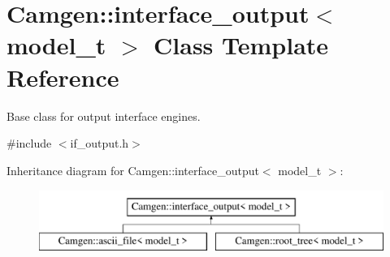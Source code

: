\hypertarget{a00315}{\section{Camgen\-:\-:interface\-\_\-output$<$ model\-\_\-t $>$ Class Template Reference}
\label{a00315}
}


Base class for output interface engines.  




{\ttfamily \#include $<$if\-\_\-output.\-h$>$}

Inheritance diagram for Camgen\-:\-:interface\-\_\-output$<$ model\-\_\-t $>$\-:\begin{figure}[H]
\begin{center}
\leavevmode
\includegraphics[height=2.000000cm]{a00315}
\end{center}
\end{figure}
